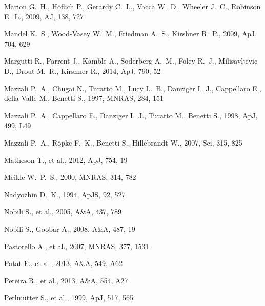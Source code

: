 \begin{thebibliography}{99}
Marion G.~H., H{\"o}flich P., Gerardy C.~L., Vacca W.~D., Wheeler J.~C., 
Robinson E.~L., 2009, AJ, 138, 727 

Mandel K.~S., Wood-Vasey W.~M., Friedman A.~S., Kirshner R.~P., 2009, ApJ, 
704, 629

 Margutti R., Parrent J., Kamble A., 
Soderberg A.~M., Foley R.~J., Milisavljevic D., Drout M.~R., Kirshner R., 
2014, ApJ, 790, 52

 Mazzali P.~A., Chugai N., Turatto M., Lucy 
L.~B., Danziger I.~J., Cappellaro E., della Valle M., Benetti S., 1997, 
MNRAS, 284, 151 

 Mazzali P.~A., Cappellaro E., Danziger 
I.~J., Turatto M., Benetti S., 1998, ApJ, 499, L49 

 Mazzali P.~A., R{\"o}pke F.~K., Benetti 
S., Hillebrandt W., 2007, Sci, 315, 825 

 Matheson T., et al., 2012, ApJ, 754, 19 

 Meikle 
W.~P.~S., 2000, MNRAS, 314, 782 

Nadyozhin D.~K., 1994, ApJS, 92, 527 

 Nobili S., et al., 2005, A\&A, 437, 789 

 Nobili S., Goobar A., 2008, A\&A, 487, 19 

 Pastorello A., et al., 2007, MNRAS, 377, 
1531 

 Patat F., et al., 2013, A\&A, 549, A62 

 Pereira R., et al., 2013, A\&A, 554, A27 

 Perlmutter S., et al., 1999, ApJ, 517, 565 


\end{thebibliography}
